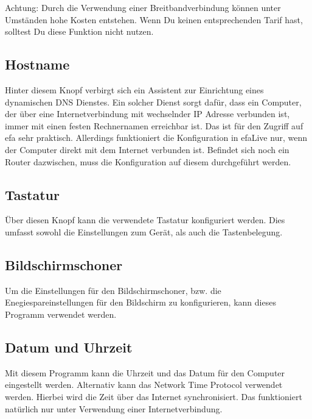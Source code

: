 \documentclass[a4paper,12pt,twoside]{article}
\begin{document}
\bigskip

Achtung: Durch die Verwendung einer Breitbandverbindung können unter
Umständen hohe Kosten entstehen. Wenn Du keinen entsprechenden Tarif
hast, solltest Du diese Funktion nicht nutzen.


\bigskip

\subsection[Hostname]{Hostname}
Hinter diesem Knopf verbirgt sich ein Assistent zur Einrichtung eines
dynamischen DNS Dienstes. Ein solcher Dienst sorgt dafür, dass ein
Computer, der über eine Internetverbindung mit wechselnder IP Adresse
verbunden ist, immer mit einen festen Rechnernamen erreichbar ist. Das
ist für den Zugriff auf efa sehr praktisch. Allerdings funktioniert die
Konfiguration in efaLive nur, wenn der Computer direkt mit dem Internet
verbunden ist. Befindet sich noch ein Router dazwischen, muss die
Konfiguration auf diesem durchgeführt werden.


\bigskip

\subsection{Tastatur}
Über diesen Knopf kann die verwendete Tastatur konfiguriert werden. Dies
umfasst sowohl die Einstellungen zum Gerät, als auch die
Tastenbelegung.


\bigskip

\subsection{Bildschirmschoner}
Um die Einstellungen für den Bildschirmschoner, bzw. die
Enegiespareinstellungen für den Bildschirm zu konfigurieren, kann
dieses Programm verwendet werden.


\bigskip

\subsection{Datum und Uhrzeit}
Mit diesem Programm kann die Uhrzeit und das Datum für den Computer
eingestellt werden. Alternativ kann das {\textquotedbl}Network Time
Protocol{\textquotedbl} verwendet werden. Hierbei wird die Zeit über
das Internet synchronisiert. Das funktioniert natürlich nur unter
Verwendung einer Internetverbindung.


\bigskip
\end{document}
